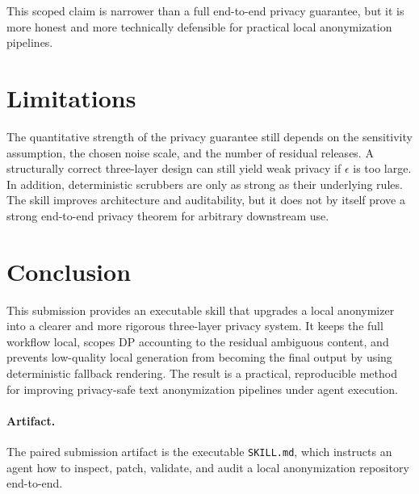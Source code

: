 \documentclass[11pt]{article}
\begin{document}
This scoped claim is narrower than a full end-to-end privacy guarantee, but it is more honest and more technically defensible for practical local anonymization pipelines.

\section{Limitations}

The quantitative strength of the privacy guarantee still depends on the sensitivity assumption, the chosen noise scale, and the number of residual releases. A structurally correct three-layer design can still yield weak privacy if $\epsilon$ is too large. In addition, deterministic scrubbers are only as strong as their underlying rules. The skill improves architecture and auditability, but it does not by itself prove a strong end-to-end privacy theorem for arbitrary downstream use.

\section{Conclusion}

This submission provides an executable skill that upgrades a local anonymizer into a clearer and more rigorous three-layer privacy system. It keeps the full workflow local, scopes DP accounting to the residual ambiguous content, and prevents low-quality local generation from becoming the final output by using deterministic fallback rendering. The result is a practical, reproducible method for improving privacy-safe text anonymization pipelines under agent execution.

\paragraph{Artifact.}
The paired submission artifact is the executable \texttt{SKILL.md}, which instructs an agent how to inspect, patch, validate, and audit a local anonymization repository end-to-end.
\end{document}
